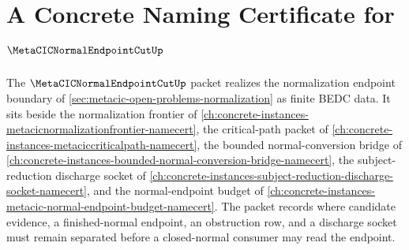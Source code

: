 \chapter{A Concrete Naming Certificate for $\MetaCICNormalEndpointCutUp$}
\label{ch:concrete-instances-metacic-normal-endpoint-cut-namecert}

The $\MetaCICNormalEndpointCutUp$ packet realizes the normalization endpoint boundary of \autoref{sec:metacic-open-problems-normalization} as finite BEDC data. It sits beside the normalization frontier of \autoref{ch:concrete-instances-metacicnormalizationfrontier-namecert}, the critical-path packet of \autoref{ch:concrete-instances-metaciccriticalpath-namecert}, the bounded normal-conversion bridge of \autoref{ch:concrete-instances-bounded-normal-conversion-bridge-namecert}, the subject-reduction discharge socket of \autoref{ch:concrete-instances-subject-reduction-discharge-socket-namecert}, and the normal-endpoint budget of \autoref{ch:concrete-instances-metacic-normal-endpoint-budget-namecert}. The packet records where candidate evidence, a finished-normal endpoint, an obstruction row, and a discharge socket must remain separated before a closed-normal consumer may read the endpoint.

